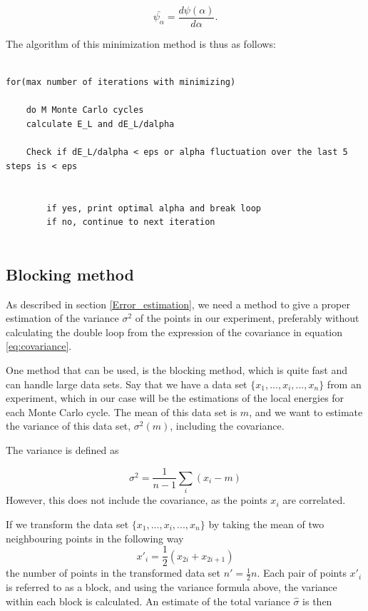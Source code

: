 \documentclass[norsk,a4paper,12pt]{article}
\begin{document}
\begin{equation}
	\bar{\psi_{\alpha}} = \frac{d \psi (\alpha)}{d \alpha}.
\end{equation}

The algorithm of this minimization method is thus as follows:

\lstset{basicstyle=\scriptsize}
\begin{lstlisting}

for(max number of iterations with minimizing)
	
	do M Monte Carlo cycles
	calculate E_L and dE_L/dalpha 
	
	Check if dE_L/dalpha < eps or alpha fluctuation over the last 5 steps is < eps
	
	
		if yes, print optimal alpha and break loop
		if no, continue to next iteration


\end{lstlisting}

\subsection{Blocking method} \label{Blocking}

As described in section \ref{Error_estimation}, we need a method to give a proper estimation of the variance $\sigma^2$ of the points in our experiment, preferably without calculating the double loop from the expression of the covariance in equation \ref{eq:covariance}. 
\par 
\vspace{3mm}

One method that can be used, is the blocking method, which is quite fast and can handle large data sets. Say that we have a data set $\{x_1, ...,x_i,..., x_n\}$ from an experiment, which in our case will be the estimations of the local energies for each Monte Carlo cycle. The mean of this data set is $m$, and we want to estimate the variance of this data set, $\sigma^2 (m)$, including the covariance.

The variance is defined as 

\begin{equation}
	\sigma^2 = \frac{1}{n-1} \sum_i (x_i - m)
\end{equation}
However, this does not include the covariance, as the points $x_i$ are correlated.

If we transform the data set $\{x_1, ...,x_i,..., x_n\}$ by taking the mean of two neighbouring points in the following way
\begin{equation}
	x'_i = \frac{1}{2}(x_{2i} + x_{2i+1})
\end{equation}
the number of points in the transformed data set $n' = \frac{1}{2} n$. Each pair of points $x'_i$ is referred to as a block, and using the variance formula above, the variance within each block is calculated. An estimate of the total variance $\hat{\sigma}$ is then
 
\end{document}
